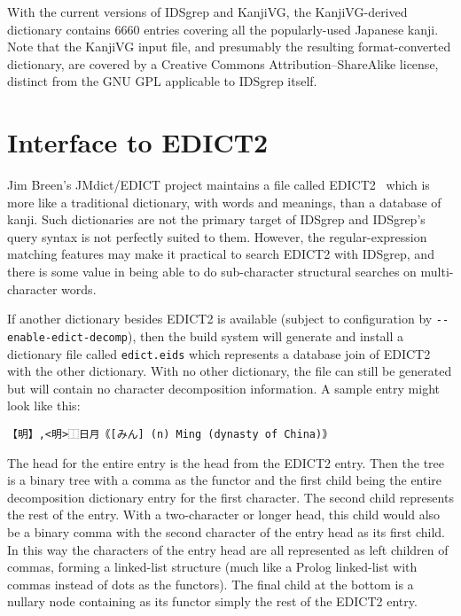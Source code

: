 \documentclass[twocolumn]{report}
\begin{document}
With the current versions of IDSgrep and KanjiVG, the KanjiVG-derived
dictionary contains 6660 entries covering all the popularly-used Japanese
kanji.  Note that the KanjiVG input file, and presumably the resulting
format-converted dictionary, are covered by a Creative Commons
Attribution--ShareAlike license, distinct from the GNU GPL applicable to
IDSgrep itself.


\section{Interface to EDICT2}

Jim Breen's JMdict/EDICT project maintains a file called
EDICT2~\cite{EDICT2} which is more like a traditional dictionary, with
words and meanings, than a database of kanji.  Such dictionaries are
not the primary target of IDSgrep and IDSgrep's query syntax is not
perfectly suited to them.  However, the regular-expression matching
features may make it practical to search EDICT2 with IDSgrep, and
there is some value in being able to do sub-character structural
searches on multi-character words.

If another dictionary besides EDICT2 is available
(subject to configuration by \texttt{-{}-enable-edict-decomp}), then the
build system will generate and install a
dictionary file called \texttt{edict.eids} which represents a database
join of EDICT2 with the other dictionary.  With no other dictionary,
the file can still be generated but will contain no character decomposition
information.
A sample entry might look like this:
\begin{verbatim}
【明】,<明>⿰日月｟[みん] (n) Ming (dynasty of China)｠
\end{verbatim}

The head for the entire entry is the head from the EDICT2 entry.  Then the
tree is a binary tree with a comma as the functor and the first child being
the entire decomposition dictionary entry for the first character.  The
second child represents the rest of the entry.  With a two-character or
longer head, this child would also be a binary comma with the second
character of the entry head as its first child.  In this way the characters
of the entry head are all represented as left children of commas, forming a
linked-list structure (much like a Prolog linked-list with commas instead of
dots as the functors).  The final child at the bottom is a nullary node
containing as its functor simply the rest of the EDICT2 entry.
\end{document}
